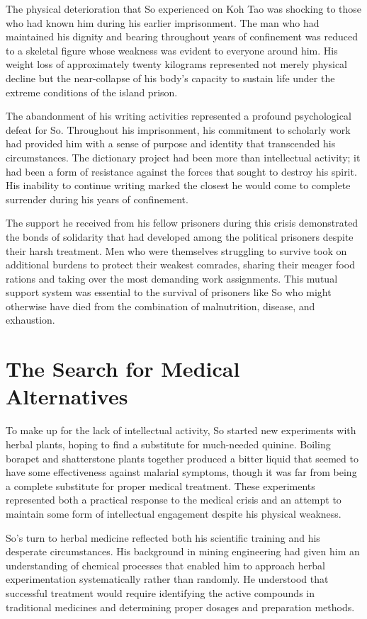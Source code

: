 \documentclass[
  Letterpaper,
]{scrbook}
\begin{document}
The physical deterioration that So experienced on Koh Tao was shocking
to those who had known him during his earlier imprisonment. The man who
had maintained his dignity and bearing throughout years of confinement
was reduced to a skeletal figure whose weakness was evident to everyone
around him. His weight loss of approximately twenty kilograms
represented not merely physical decline but the near-collapse of his
body's capacity to sustain life under the extreme conditions of the
island prison.

The abandonment of his writing activities represented a profound
psychological defeat for So. Throughout his imprisonment, his commitment
to scholarly work had provided him with a sense of purpose and identity
that transcended his circumstances. The dictionary project had been more
than intellectual activity; it had been a form of resistance against the
forces that sought to destroy his spirit. His inability to continue
writing marked the closest he would come to complete surrender during
his years of confinement.

The support he received from his fellow prisoners during this crisis
demonstrated the bonds of solidarity that had developed among the
political prisoners despite their harsh treatment. Men who were
themselves struggling to survive took on additional burdens to protect
their weakest comrades, sharing their meager food rations and taking
over the most demanding work assignments. This mutual support system was
essential to the survival of prisoners like So who might otherwise have
died from the combination of malnutrition, disease, and exhaustion.

\section{The Search for Medical
Alternatives}\label{the-search-for-medical-alternatives}

To make up for the lack of intellectual activity, So started new
experiments with herbal plants, hoping to find a substitute for
much-needed quinine. Boiling borapet and shatterstone plants together
produced a bitter liquid that seemed to have some effectiveness against
malarial symptoms, though it was far from being a complete substitute
for proper medical treatment. These experiments represented both a
practical response to the medical crisis and an attempt to maintain some
form of intellectual engagement despite his physical weakness.

So's turn to herbal medicine reflected both his scientific training and
his desperate circumstances. His background in mining engineering had
given him an understanding of chemical processes that enabled him to
approach herbal experimentation systematically rather than randomly. He
understood that successful treatment would require identifying the
active compounds in traditional medicines and determining proper dosages
and preparation methods.
\end{document}

